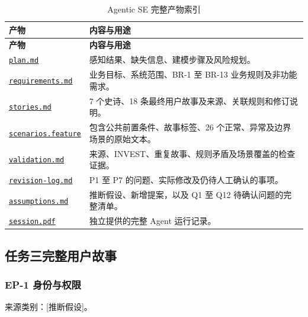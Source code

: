 \documentclass[11pt,a4paper]{article}
\begin{document}
\begin{longtable}{@{}p{}p{}@{}}
    \caption{Agentic SE 完整产物索引} \\
    \toprule
    \textbf{产物} & \textbf{内容与用途} \\
    \midrule
    \endfirsthead
    \toprule
    \textbf{产物} & \textbf{内容与用途} \\
    \midrule
    \endhead
    \bottomrule
    \endlastfoot
    \href{run:task3/output/plan.md}{\texttt{plan.md}} & 感知结果、缺失信息、建模步骤及风险规划。 \\
    \midrule
    \href{run:task3/output/requirements.md}{\texttt{requirements.md}} & 业务目标、系统范围、BR-1 至 BR-13 业务规则及非功能需求。 \\
    \midrule
    \href{run:task3/output/stories.md}{\texttt{stories.md}} & 7 个史诗、18 条最终用户故事及来源、关联规则和修订说明。 \\
    \midrule
    \href{run:task3/output/scenarios.feature}{\texttt{scenarios.feature}} & 包含公共前置条件、故事标签、26 个正常、异常及边界场景的原始文本。 \\
    \midrule
    \href{run:task3/output/validation.md}{\texttt{validation.md}} & 来源、INVEST、重复故事、规则矛盾及场景覆盖的检查证据。 \\
    \midrule
    \href{run:task3/output/revision-log.md}{\texttt{revision-log.md}} & P1 至 P7 的问题、实际修改及仍待人工确认的事项。 \\
    \midrule
    \href{run:task3/output/assumptions.md}{\texttt{assumptions.md}} & 推断假设、新增提案，以及 Q1 至 Q12 待确认问题的完整清单。 \\
    \midrule
    \href{run:task3/output/session.pdf}{\texttt{session.pdf}} & 独立提供的完整 Agent 运行记录。 \\
\end{longtable}

\subsection{任务三完整用户故事}\label{app:agentic-stories}

\subsubsection{EP-1 身份与权限}
来源类别：[推断假设]。
\end{document}
